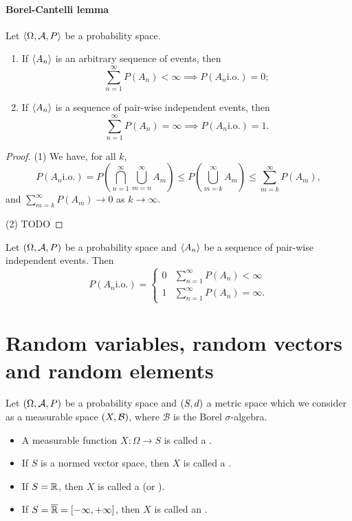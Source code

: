 \subsubsection{Borel-Cantelli lemma}
\begin{proposition}
Let $\langle \Omega, \mathcal{A}, P \rangle$ be a probability space.
\begin{enumerate}
\item If $\langle A_n \rangle$ is an arbitrary sequence of events, then
\[ \sum_{n=1}^\infty P(A_n) < \infty \implies P(A_n \text{i.o.}) = 0; \]
\item If $\langle A_n \rangle$ is a sequence of pair-wise independent events, then
\[ \sum_{n=1}^\infty P(A_n) = \infty \implies P(A_n \text{i.o.}) = 1. \]
\end{enumerate}
\end{proposition}
\begin{proof}
(1) We have, for all $k$,
\[ P(A_n \text{i.o.}) = P\left(\bigcap_{n=1}^\infty\bigcup_{m=n}^\infty A_m\right) \leq P\left(\bigcup_{m=k}^\infty A_m\right) \leq \sum_{m=k}^\infty P(A_m), \]
and $\sum_{m=k}^\infty P(A_m) \to 0$ as $k\to \infty$.

(2) TODO
\end{proof}
\begin{corollary}
Let $\left( \Omega, \mathcal{A}, P \right)$ be a probability space and $\langle A_n \rangle$ be a sequence of pair-wise independent events. Then
\[  P(A_n \text{i.o.}) = \begin{cases}
0 & \sum_{n=1}^\infty P(A_n) < \infty \\
1 & \sum_{n=1}^\infty P(A_n) = \infty.
\end{cases} \]
\end{corollary}

\chapter{Random variables, random vectors and random elements}
\begin{definition}
Let $\left( \Omega, \mathcal{A}, P \right)$ be a probability space and $\left( S, d \right)$ a metric space which we consider as a measurable space $\left( X,\mathcal{B} \right)$, where $\mathcal{B}$ is the Borel $\sigma$-algebra.
\begin{itemize}
\item A measurable function $X:\Omega \to S$ is called a .
\item If $S$ is a normed vector space, then $X$ is called a .
\item If $S = \mathbb{R}$, then $X$ is called a  (or ).
\item If $S = \overline{\mathbb{R}} = [-\infty, +\infty]$, then $X$ is called an .
\end{itemize}
\end{definition}


